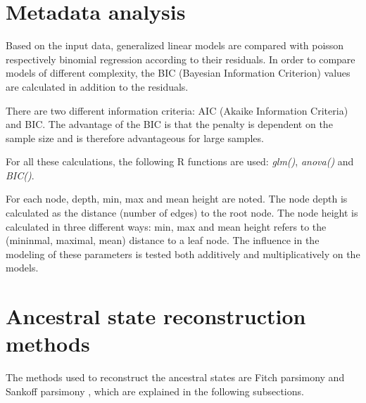   \section{Metadata analysis} \label{sec:methods - metadata analysis}
    Based on the input data, generalized linear models are compared with poisson respectively binomial 
      regression according to their residuals. In order to compare models of different complexity, the 
      BIC (Bayesian Information Criterion) values are calculated in addition to the residuals.
      
    There are two different information criteria: AIC (Akaike Information Criteria) and BIC. The 
    advantage of the BIC is that the penalty is dependent on the sample size and is therefore 
      advantageous for large samples.
      
    For all these calculations, the following R functions are  used: \textit{glm()}, \textit{anova()} 
      and \textit{BIC()}.

    For each node, depth, min, max and mean height are  noted. The node depth is calculated as the
      distance (number of edges) to the root node. The node height is calculated in three different 
      ways: min, max and mean height refers to the (mininmal, maximal, mean) distance to a leaf node.
      The influence in the modeling of these parameters is tested both additively and multiplicatively 
      on the models.

  \section{Ancestral state reconstruction methods} \label{sec:methods - ancestral state reconstruction}
    The methods used to reconstruct the ancestral states are Fitch parsimony \cite{Fitch1971} and 
      Sankoff parsimony \cite{Sankoff1975}, which are explained in the following subsections.

